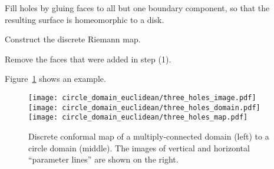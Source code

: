 \documentclass[Thesis]{subfiles}
\begin{document}
\begin{compactenum}[(1)]
\item Fill holes by gluing faces to all but one boundary component,
  so that the resulting surface is homeomorphic to a disk.
\item Construct the discrete Riemann map.
\item Remove the faces that were added in step (1). 
\end{compactenum}

Figure~\ref{fig:euclidean_circle_domain} shows an example.
\begin{figure}
\centering
\texttt{[image: circle\_domain\_euclidean/three\_holes\_image.pdf]}%
\texttt{[image: circle\_domain\_euclidean/three\_holes\_domain.pdf]}%
\texttt{[image: circle\_domain\_euclidean/three\_holes\_map.pdf]}\\
\caption{
Discrete conformal map of a multiply-connected domain (left) to a
circle domain (middle). The images of vertical and horizontal ``parameter
lines'' are shown on the right.
}
\label{fig:euclidean_circle_domain}
\end{figure}

\end{document}
